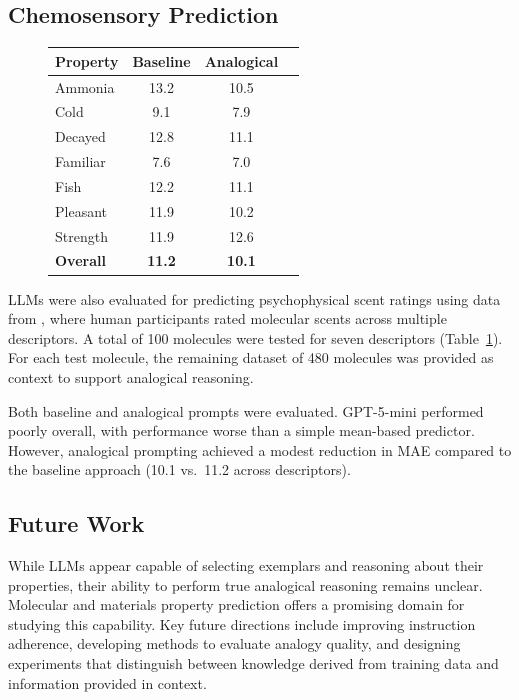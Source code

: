 \subsection*{Chemosensory Prediction}
\begin{figure}
\vspace{-\baselineskip}
\centering
\begin{tabular}{lccc}
\toprule
\textbf{Property} & \textbf{Baseline} & \textbf{Analogical} \\
\midrule
Ammonia  & 13.2 & 10.5 \\
Cold     &  9.1 &  7.9 \\
Decayed  & 12.8 & 11.1 \\
Familiar &  7.6 &  7.0 \\
Fish     & 12.2 & 11.1 \\
Pleasant & 11.9 & 10.2 \\
Strength & 11.9 & 12.6 \\
\midrule
\textbf{Overall} & \textbf{11.2} & \textbf{10.1} \\
\bottomrule
\end{tabular}
\label{tab:umbc_scent_mae}
\end{figure}

\indent \indent LLMs were also evaluated for predicting psychophysical scent ratings using data from \cite{keller2016olfactory}, where human participants rated molecular scents across multiple descriptors. A total of 100 molecules were tested for seven descriptors (Table~\ref{tab:umbc_scent_mae}). For each test molecule, the remaining dataset of 480 molecules was provided as context to support analogical reasoning.

\vspace{0.3\baselineskip}
Both baseline and analogical prompts were evaluated. GPT-5-mini performed poorly overall, with performance worse than a simple mean-based predictor. However, analogical prompting achieved a modest reduction in MAE compared to the baseline approach (10.1 vs.\ 11.2 across descriptors).

\vspace{-0.3\baselineskip}
\subsection*{Future Work}
\indent \indent While LLMs appear capable of selecting exemplars and reasoning about their properties, their ability to perform true analogical reasoning remains unclear. Molecular and materials property prediction offers a promising domain for studying this capability. Key future directions include improving instruction adherence, developing methods to evaluate analogy quality, and designing experiments that distinguish between knowledge derived from training data and information provided in context.

